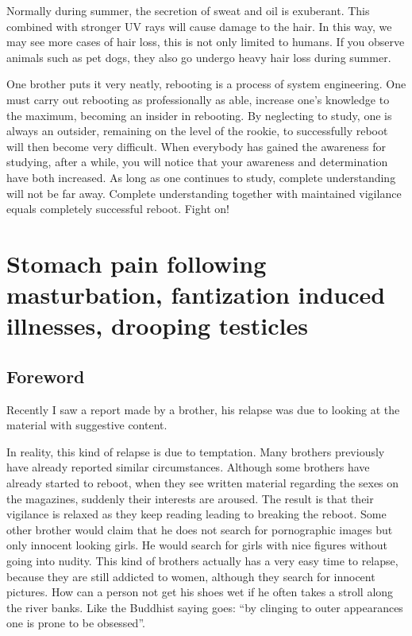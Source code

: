\documentclass[
]{book}
\begin{document}
Normally during summer, the secretion of sweat and oil is exuberant. This combined with stronger UV rays will cause damage to the hair. In this way, we may see more cases of hair loss, this is not only limited to humans. If you observe animals such as pet dogs, they also go undergo heavy hair loss during summer.

One brother puts it very neatly, rebooting is a process of system engineering. One must carry out rebooting as professionally as able, increase one's knowledge to the maximum, becoming an insider in rebooting. By neglecting to study, one is always an outsider, remaining on the level of the rookie, to successfully reboot will then become very difficult. When everybody has gained the awareness for studying, after a while, you will notice that your awareness and determination have both increased. As long as one continues to study, complete understanding will not be far away. Complete understanding together with maintained vigilance equals completely successful reboot. Fight on!

\hypertarget{stomach-pain-following-masturbation-fantization-induced-illnesses-drooping-testicles}{%
\chapter{Stomach pain following masturbation, fantization induced illnesses, drooping testicles}\label{stomach-pain-following-masturbation-fantization-induced-illnesses-drooping-testicles}}

\hypertarget{foreword-2}{%
\section{Foreword}\label{foreword-2}}

Recently I saw a report made by a brother, his relapse was due to looking at the material with suggestive content.

In reality, this kind of relapse is due to temptation. Many brothers previously have already reported similar circumstances. Although some brothers have already started to reboot, when they see written material regarding the sexes on the magazines, suddenly their interests are aroused. The result is that their vigilance is relaxed as they keep reading leading to breaking the reboot. Some other brother would claim that he does not search for pornographic images but only innocent looking girls. He would search for girls with nice figures without going into nudity. This kind of brothers actually has a very easy time to relapse, because they are still addicted to women, although they search for innocent pictures. How can a person not get his shoes wet if he often takes a stroll along the river banks. Like the Buddhist saying goes: ``by clinging to outer appearances one is prone to be obsessed''.
\end{document}

